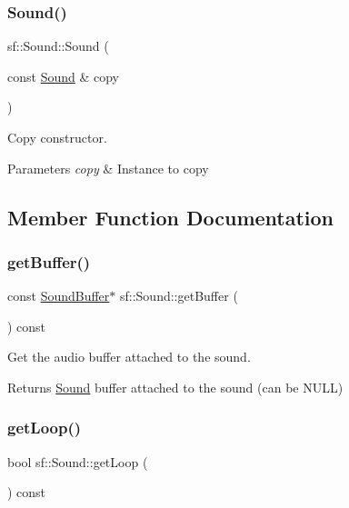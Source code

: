 \subsubsection{\texorpdfstring{Sound()}{Sound()}\hspace{0.1cm}{\footnotesize\ttfamily [2/2]}}
{\footnotesize\ttfamily sf\+::\+Sound\+::\+Sound (\begin{DoxyParamCaption}\item[{const \hyperlink{classsf_1_1_sound}{Sound} \&}]{copy }\end{DoxyParamCaption})}



Copy constructor. 


\begin{DoxyParams}{Parameters}
{\em copy} & Instance to copy \\
\hline
\end{DoxyParams}


\subsection{Member Function Documentation}
\mbox{\label{classsf_1_1_sound_ab873727ae652c96b5a9437d7f8d8a44d}} 
\subsubsection{\texorpdfstring{get\+Buffer()}{getBuffer()}}
{\footnotesize\ttfamily const \hyperlink{classsf_1_1_sound_buffer}{Sound\+Buffer}$\ast$ sf\+::\+Sound\+::get\+Buffer (\begin{DoxyParamCaption}{ }\end{DoxyParamCaption}) const}



Get the audio buffer attached to the sound. 

\begin{DoxyReturn}{Returns}
\hyperlink{classsf_1_1_sound}{Sound} buffer attached to the sound (can be N\+U\+LL) 
\end{DoxyReturn}
\mbox{\label{classsf_1_1_sound_a054da07266ce8f39229495146e3041eb}} 
\subsubsection{\texorpdfstring{get\+Loop()}{getLoop()}}
{\footnotesize\ttfamily bool sf\+::\+Sound\+::get\+Loop (\begin{DoxyParamCaption}{ }\end{DoxyParamCaption}) const}



